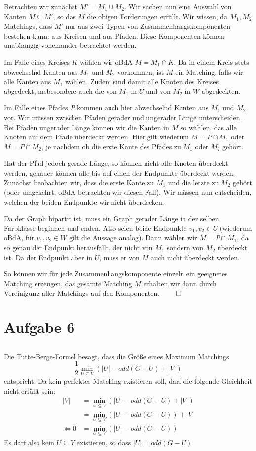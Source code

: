 \documentclass[a4paper]{article}
\begin{document}
Betrachten wir zunächst $M' = M_1 \cup M_2$. Wir suchen nun eine Auswahl von
Kanten $M \subseteq M'$, so das $M$ die obigen Forderungen erfüllt.
Wir wissen, da $M_1, M_2$
Matchings, dass $M'$ nur aus zwei Typen von Zusammenhangskomponenten
bestehen kann: aus Kreisen und aus Pfaden. Diese Komponenten können
unabhängig voneinander betrachtet werden.

Im Falle eines Kreises $K$ wählen wir oBdA $M = M_1 \cap K$. Da in einem
Kreis stets abwechselnd Kanten aus $M_1$ und $M_2$ vorkommen, ist $M$ ein
Matching, falls wir alle Kanten aus $M_1$ wählen. Zudem sind damit alle
Knoten des Kreises abgedeckt, insbesondere auch die von $M_1$ in $U$ und von
$M_2$ in $W$ abgedeckten.

Im Falle eines Pfades $P$ kommen auch hier abwechselnd Kanten aus $M_1$ und
$M_2$ vor. Wir müssen zwischen Pfaden gerader und ungerader Länge unterscheiden.
Bei Pfaden ungerader Länge können wir die Kanten in $M$ so wählen, das alle
Knoten auf dem Pfade überdeckt werden. Hier gilt wiederum $M = P \cap M_1$
oder $M = P \cap M_2$, je nachdem ob die erste Kante des Pfades zu $M_1$
oder $M_2$ gehört.

Hat der Pfad jedoch gerade Länge, so können nicht alle Knoten überdeckt
werden, genauer können alle bis auf einen der Endpunkte überdeckt werden.
Zunächst beobachten wir, dass die erste Kante zu $M_1$ und die
letzte zu $M_2$ gehört (oder umgekehrt, oBdA betrachten wir diesen Fall).
Wir müssen nun entscheiden, welchen der beiden Endpunkte wir nicht
überdecken.

Da der Graph bipartit ist, muss ein Graph gerader Länge in der selben
Farbklasse beginnen und enden. Also seien beide Endpunkte $v_1, v_2 \in U$
(wiederum oBdA, für $v_1, v_2 \in W$ gilt die Aussage analog).
Dann wählen wir $M = P \cap M_1$, da so genau der Endpunkt herausfällt, der
nicht von $M_1$ sondern von $M_2$ überdeckt ist. Da der Endpunkt aber in
$U$, muss er von $M$ auch nicht überdeckt werden.

So können wir für jede Zusammenhangskomponente einzeln ein geeignetes
Matching erzeugen, das gesamte Matching $M$ erhalten wir dann durch
Vereinigung aller Matchings auf den Komponenten. $\qed$

\section{Aufgabe 6}
\subsection{}
Die Tutte-Berge-Formel besagt, dass die Größe eines Maximum Matchings
\[
	\frac{1}{2} \min_{U \subseteq V} ( |U| - odd(G - U) + |V|)
\]
entspricht. Da kein perfektes Matching existieren soll, darf die folgende
Gleichheit nicht erfüllt sein:
\begin{align*}
|V| &= \min_{U \subseteq V} ( |U| - odd(G - U) + |V|) \\
	&= \min_{U \subseteq V} ( |U| - odd(G - U) ) + |V| \\
\Leftrightarrow 0 &= \min_{U \subseteq V} ( |U| - odd(G - U) )
\end{align*}
Es darf also kein $U \subseteq V$ existieren, so dass $|U| = odd(G - U)$.
\end{document}
